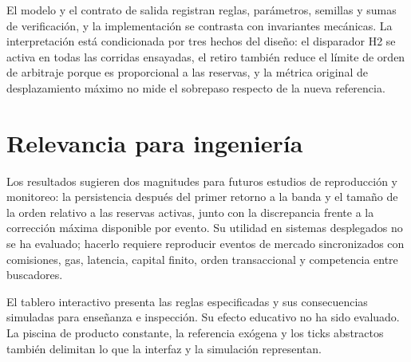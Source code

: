 El modelo y el contrato de salida registran reglas, parámetros, semillas y sumas de verificación, y la implementación se contrasta con invariantes mecánicas. La interpretación está condicionada por tres hechos del diseño: el disparador H2 se activa en todas las corridas ensayadas, el retiro también reduce el límite de orden de arbitraje porque es proporcional a las reservas, y la métrica original de desplazamiento máximo no mide el sobrepaso respecto de la nueva referencia.

\section{Relevancia para ingeniería}

Los resultados sugieren dos magnitudes para futuros estudios de reproducción y monitoreo: la persistencia después del primer retorno a la banda y el tamaño de la orden relativo a las reservas activas, junto con la discrepancia frente a la corrección máxima disponible por evento. Su utilidad en sistemas desplegados no se ha evaluado; hacerlo requiere reproducir eventos de mercado sincronizados con comisiones, gas, latencia, capital finito, orden transaccional y competencia entre buscadores.

El tablero interactivo presenta las reglas especificadas y sus consecuencias simuladas para enseñanza e inspección. Su efecto educativo no ha sido evaluado. La piscina de producto constante, la referencia exógena y los ticks abstractos también delimitan lo que la interfaz y la simulación representan.
